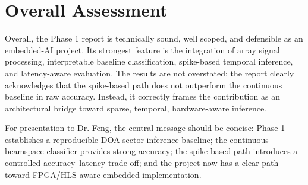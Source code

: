 \documentclass[11pt]{article}
\begin{document}
\section{Overall Assessment}

Overall, the Phase 1 report is technically sound, well scoped, and defensible as an embedded-AI project. Its strongest feature is the integration of array signal processing, interpretable baseline classification, spike-based temporal inference, and latency-aware evaluation. The results are not overstated: the report clearly acknowledges that the spike-based path does not outperform the continuous baseline in raw accuracy. Instead, it correctly frames the contribution as an architectural bridge toward sparse, temporal, hardware-aware inference.

For presentation to Dr. Feng, the central message should be concise: Phase 1 establishes a reproducible DOA-sector inference baseline; the continuous beamspace classifier provides strong accuracy; the spike-based path introduces a controlled accuracy--latency trade-off; and the project now has a clear path toward FPGA/HLS-aware embedded implementation.

\clearpage


\end{document}
